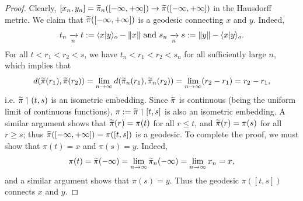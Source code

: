 \begin{proof}
Clearly, $[x_n,y_n] = \widetilde\pi_n([-\infty,+\infty]) \to \widetilde\pi([-\infty,+\infty])$ in the Hausdorff metric. We claim that $\widetilde\pi([-\infty,+\infty])$ is a geodesic connecting $x$ and $y$. Indeed,
\[
t_n \xrightarrow[n]{} t := \langle x|y\rangle_o - \|x\| \textup{ and } s_n \xrightarrow[n]{} s := \|y\| - \langle x|y\rangle_o.
\]
For all $t < r_1 < r_2 < s$, we have $t_n < r_1 < r_2 < s_n$ for all sufficiently large $n$, which implies that
\[
d(\widetilde\pi(r_1) , \widetilde\pi(r_2)) = \lim_{n\to\infty} d(\widetilde\pi_n(r_1) , \widetilde\pi_n(r_2)) = \lim_{n\to\infty} (r_2 - r_1) = r_2 - r_1,
\]
i.e. $\widetilde\pi\upharpoonleft(t,s)$ is an isometric embedding. Since $\widetilde\pi$ is continuous (being the uniform limit of continuous functions), $\pi := \widetilde\pi\upharpoonleft[t,s]$ is also an isometric embedding. A similar argument shows that $\widetilde\pi(r) = \pi(t)$ for all $r\leq t$, and $\widetilde\pi(r) = \pi(s)$ for all $r\geq s$; thus $\widetilde\pi([-\infty,+\infty]) = \pi([t,s])$ is a geodesic. To complete the proof, we must show that $\pi(t) = x$ and $\pi(s) = y$. Indeed,
\[
\pi(t) = \widetilde\pi(-\infty) = \lim_{n\to\infty} \widetilde\pi_n(-\infty) = \lim_{n\to\infty} x_n = x,
\]
and a similar argument shows that $\pi(s) = y$. Thus the geodesic $\pi([t,s])$ connects $x$ and $y$.
\end{proof}

%
%



